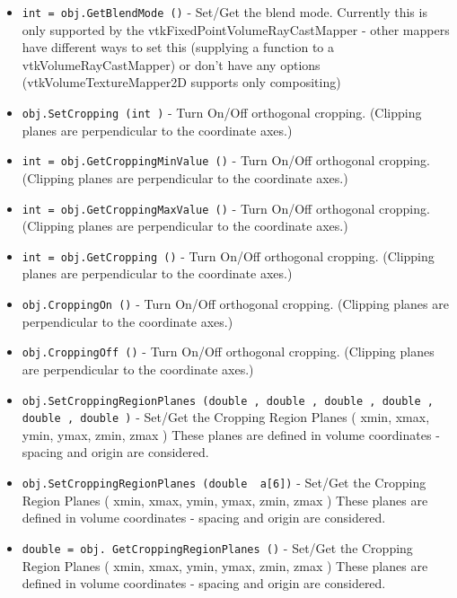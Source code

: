 \begin{itemize}
\item  \verb|int = obj.GetBlendMode ()| -  Set/Get the blend mode. Currently this is only supported
 by the vtkFixedPointVolumeRayCastMapper - other mappers
 have different ways to set this (supplying a function
 to a vtkVolumeRayCastMapper) or don't have any options
 (vtkVolumeTextureMapper2D supports only compositing)

\item  \verb|obj.SetCropping (int )| -  Turn On/Off orthogonal cropping. (Clipping planes are
 perpendicular to the coordinate axes.)

\item  \verb|int = obj.GetCroppingMinValue ()| -  Turn On/Off orthogonal cropping. (Clipping planes are
 perpendicular to the coordinate axes.)

\item  \verb|int = obj.GetCroppingMaxValue ()| -  Turn On/Off orthogonal cropping. (Clipping planes are
 perpendicular to the coordinate axes.)

\item  \verb|int = obj.GetCropping ()| -  Turn On/Off orthogonal cropping. (Clipping planes are
 perpendicular to the coordinate axes.)

\item  \verb|obj.CroppingOn ()| -  Turn On/Off orthogonal cropping. (Clipping planes are
 perpendicular to the coordinate axes.)

\item  \verb|obj.CroppingOff ()| -  Turn On/Off orthogonal cropping. (Clipping planes are
 perpendicular to the coordinate axes.)

\item  \verb|obj.SetCroppingRegionPlanes (double , double , double , double , double , double )| -  Set/Get the Cropping Region Planes ( xmin, xmax, ymin, ymax, zmin, zmax )
 These planes are defined in volume coordinates - spacing and origin are
 considered.

\item  \verb|obj.SetCroppingRegionPlanes (double  a[6])| -  Set/Get the Cropping Region Planes ( xmin, xmax, ymin, ymax, zmin, zmax )
 These planes are defined in volume coordinates - spacing and origin are
 considered.

\item  \verb|double = obj. GetCroppingRegionPlanes ()| -  Set/Get the Cropping Region Planes ( xmin, xmax, ymin, ymax, zmin, zmax )
 These planes are defined in volume coordinates - spacing and origin are
 considered.


\end{itemize}
